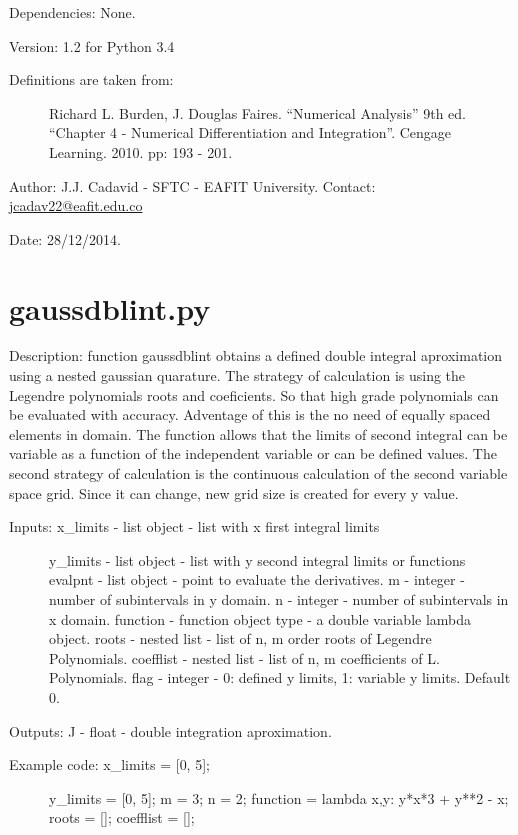 \documentclass[letterpaper,10pt,oneside]{sphinxmanual}
\theoremstyle{plain}%
\theoremstyle{definition}%
\theoremstyle{remark}%
\begin{document}
Dependencies: None.

Version: 1.2 for Python 3.4
\begin{description}
\item[{Definitions are taken from:}] \leavevmode
Richard L. Burden, J. Douglas Faires. ``Numerical Analysis'' 9th ed.
``Chapter 4 - Numerical Differentiation and Integration''. 
Cengage Learning. 2010. pp: 193 - 201.

\end{description}

Author: J.J. Cadavid - SFTC - EAFIT University.
Contact: \href{mailto:jcadav22@eafit.edu.co}{jcadav22@eafit.edu.co}

Date: 28/12/2014.


\section{gaussdblint.py}
\label{code:module-gaussdblint}\label{code:gaussdblint-py}
Description: function gaussdblint obtains a defined double integral 
aproximation using a nested gaussian quarature. The strategy of calculation
is using the Legendre polynomials roots and coeficients. So that high grade 
polynomials can be evaluated with accuracy. Adventage of this is the no
need of equally spaced elements in domain. The function allows that the
limits of second integral can be variable as a function of the independent
variable or can be defined values. The second strategy of calculation is
the continuous calculation of the second variable space grid. Since
it can change, new grid size is created for every y value.
\begin{description}
\item[{Inputs: x\_limits - list object - list with x first integral limits}] \leavevmode
y\_limits - list object - list with y second integral limits or functions
evalpnt - list object - point to evaluate the derivatives.
m - integer - number of subintervals in y domain.
n - integer - number of subintervals in x domain.
function - function object type - a double variable lambda object.
roots - nested list - list of n, m order roots of Legendre Polynomials.
coefflist - nested list - list of n, m coefficients of L. Polynomials.
flag - integer - 0: defined y limits, 1: variable y limits. Default 0.

\end{description}

Outputs: J - float - double integration aproximation.
\begin{description}
\item[{Example code: x\_limits = {[}0, 5{]};}] \leavevmode
y\_limits = {[}0, 5{]};
m = 3;
n = 2;
function = lambda x,y: y*x*3 + y**2 - x;
roots = {[}{]};
coefflist = {[}{]};

\end{description}
\end{document}

